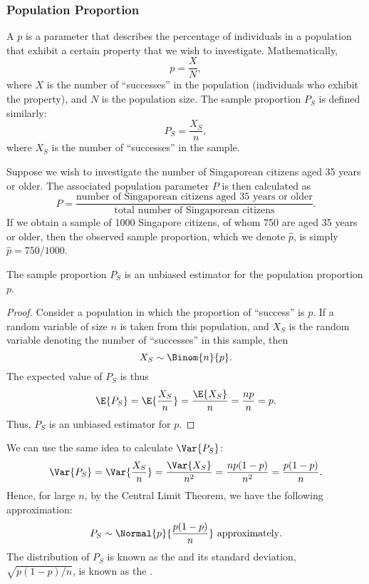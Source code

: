 \subsubsection{Population Proportion}

\begin{definition}
    A  $p$ is a parameter that describes the percentage of individuals in a population that exhibit a certain property that we wish to investigate. Mathematically, \[p = \frac{X}{N},\] where $X$ is the number of ``successes'' in the population (individuals who exhibit the property), and $N$ is the population size. The sample proportion $P_S$ is defined similarly: \[P_S = \frac{X_S}{n},\] where $X_S$ is the number of ``successes'' in the sample.
\end{definition}

\begin{example}
    Suppose we wish to investigate the number of Singaporean citizens aged 35 years or older. The associated population parameter $P$ is then calculated as \[P = \frac{\text{number of Singaporean citizens aged 35 years or older}}{\text{total number of Singaporean citizens}}.\] If we obtain a sample of 1000 Singapore citizens, of whom 750 are aged 35 years or older, then the observed sample proportion, which we denote $\hat{p}$, is simply $\hat{p} = 750/1000$.
\end{example}

\begin{proposition}
    The sample proportion $P_S$ is an unbiased estimator for the population proportion $p$.
\end{proposition}
\begin{proof}
    Consider a population in which the proportion of ``success'' is $p$. If a random variable of size $n$ is taken from this population, and $X_S$ is the random variable denoting the number of ``successes'' in this sample, then \[X_S \sim \Binom{n}{p}.\] The expected value of $P_S$ is thus \[\E{P_S} = \E{\frac{X_S}{n}} = \frac{\E{X_S}}{n} = \frac{np}{n} = p.\] Thus, $P_S$ is an unbiased estimator for $p$.
\end{proof}

We can use the same idea to calculate $\Var{P_S}$: \[\Var{P_S} = \Var{\frac{X_S}{n}} = \frac{\Var{X_S}}{n^2} = \frac{np(1-p)}{n^2} = \frac{p(1-p)}{n}.\] Hence, for large $n$, by the Central Limit Theorem, we have the following approximation: \[P_S \sim \Normal{p}{\frac{p(1-p)}{n}} \text{ approximately}.\] The distribution of $P_S$ is known as the  and its standard deviation, $\sqrt{p(1-p)/n}$, is known as the .